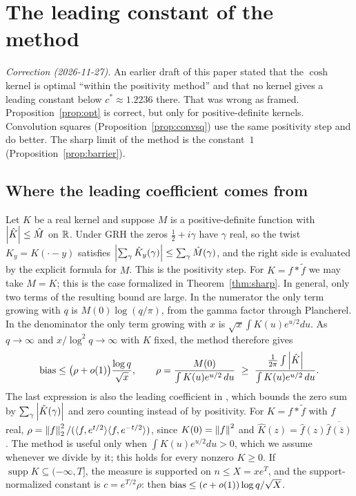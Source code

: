 \section{The leading constant of the method}\label{sec:optimality}

\emph{Correction (2026-11-27).} An earlier draft of this paper stated that the $\cosh$ kernel is optimal
``within the positivity method'' and that no kernel gives a leading constant below $c^*\approx1.2236$ there.
That was wrong as framed. Proposition~\ref{prop:opt} is correct, but only for positive-definite kernels.
Convolution squares (Proposition~\ref{prop:convsq}) use the same positivity step and do better. The sharp
limit of the method is the constant~$1$ (Proposition~\ref{prop:barrier}).

\subsection{Where the leading coefficient comes from}
Let $K$ be a real kernel and suppose $M$ is a positive-definite function with $\left\lvert \hat K \right\rvert\le\hat M$ on $\mathbb{R}$.
Under GRH the zeros $\frac12+i\gamma$ have $\gamma$ real, so the twist $K_y=K(\cdot-y)$ satisfies
$\left\lvert \sum_\gamma\hat K_y(\gamma) \right\rvert\le\sum_\gamma\hat M(\gamma)$, and the right side is evaluated by the explicit
formula for $M$. This is the positivity step. For $K=f*\tilde f$ we may take $M=K$; this is the case formalized in
Theorem~\ref{thm:sharp}. In general, only two terms of the resulting bound are large. In the numerator the only
term growing with $q$ is $M(0)\log(q/\pi)$, from the gamma factor through Plancherel. In the denominator the only
term growing with $x$ is $\sqrt x\int K(u)e^{u/2}du$. As $q\to\infty$ and $x/\log^2q\to\infty$ with $K$ fixed,
the method therefore gives
\begin{equation}\label{eq:leading}
  \bias\le\bigl(\rho+o(1)\bigr)\frac{\log q}{\sqrt x},\qquad
  \rho=\frac{M(0)}{\int K(u)e^{u/2}\,du}\ \ge\ \frac{\frac1{2\pi}\int\abs{\hat K}}{\int K(u)e^{u/2}\,du}.
\end{equation}
The last expression is also the leading coefficient in \cite[Lemma~6.1]{lls2015}, which bounds the zero sum by
$\sum_\gamma\left\lvert \hat K(\gamma) \right\rvert$ and zero counting instead of by positivity. For $K=f*\tilde f$ with $f$ real,
$\rho=\left\lVert f \right\rVert_2^2/(\langle f,e^{t/2}\rangle\langle f,e^{-t/2}\rangle)$, since $K(0)=\left\lVert f \right\rVert^2$ and
$\hat K(z)=\hat f(z)\overline{\hat f(\bar z)}$. The method is useful only when $\int K(u)e^{u/2}du>0$, which we assume
whenever we divide by it; this holds for every nonzero $K\ge0$. If $\operatorname{supp}K\subseteq(-\infty,T]$, the measure is
supported on $n\le X=xe^{T}$, and the support-normalized constant is $c=e^{T/2}\rho$: then
$\operatorname{bias}\le(c+o(1))\log q/\sqrt X$.

